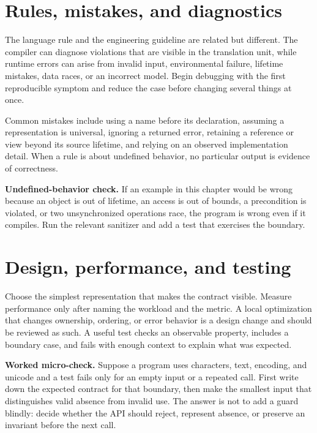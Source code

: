 \section{Rules, mistakes, and diagnostics}
The language rule and the engineering guideline are related but different. The compiler can diagnose violations that are visible in the translation unit, while runtime errors can arise from invalid input, environmental failure, lifetime mistakes, data races, or an incorrect model. Begin debugging with the first reproducible symptom and reduce the case before changing several things at once.

Common mistakes include using a name before its declaration, assuming a representation is universal, ignoring a returned error, retaining a reference or view beyond its source lifetime, and relying on an observed implementation detail. When a rule is about undefined behavior, no particular output is evidence of correctness.

\begin{warning}
\textbf{Undefined-behavior check.} If an example in this chapter would be wrong because an object is out of lifetime, an access is out of bounds, a precondition is violated, or two unsynchronized operations race, the program is wrong even if it compiles. Run the relevant sanitizer and add a test that exercises the boundary.
\end{warning}

\section{Design, performance, and testing}
Choose the simplest representation that makes the contract visible. Measure performance only after naming the workload and the metric. A local optimization that changes ownership, ordering, or error behavior is a design change and should be reviewed as such. A useful test checks an observable property, includes a boundary case, and fails with enough context to explain what was expected.

\begin{worked}
\textbf{Worked micro-check.} Suppose a program uses characters, text, encoding, and unicode and a test fails only for an empty input or a repeated call. First write down the expected contract for that boundary, then make the smallest input that distinguishes valid absence from invalid use. The answer is not to add a guard blindly: decide whether the API should reject, represent absence, or preserve an invariant before the next call.
\end{worked}

